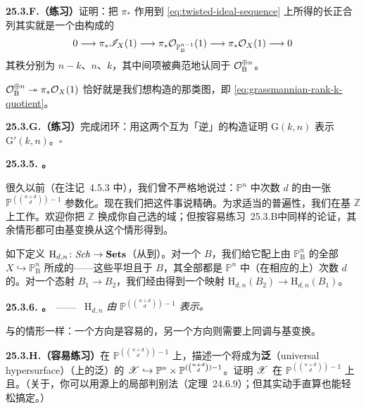 \textbf{25.3.F.（练习）}\quad 证明：把 $\pi_*$ 作用到 \eqref{eq:twisted-ideal-sequence} 上所得的长正合列其实就是一个由\trLocallyFreeSheaf{}构成的\trShortExactSequence
\[
0\longrightarrow\pi_*\mathscr{I}_X(1)\longrightarrow\pi_*\mathcal{O}_{\mathbb{P}^{n-1}_{\mathrm{B}}}(1)\longrightarrow\pi_*\mathcal{O}_X(1)\longrightarrow 0
\]
其秩分别为 $n-k$、$n$、$k$，其中间项被典范地认同于 $\mathcal{O}_{\mathrm{B}}^{\oplus n}$。

\trSurjectiveMap{} $\mathcal{O}_{\mathrm{B}}^{\oplus n}\twoheadrightarrow\pi_*\mathcal{O}_X(1)$ 恰好就是我们想构造的那类图，即 \eqref{eq:grassmannian-rank-k-quotient}。

\textbf{25.3.G.（练习）}\quad 完成闭环：用这两个互为「逆」的构造证明 $\mathrm{G}(k,n)$ 表示\trFunctor{} $\mathrm{G}'(k,n)$。\hfill$\square$

\textbf{25.3.5. \trHypersurface。}

很久以前（在\mbox{注记~4.5.3} 中），我们曾不严格地说过：$\mathbb{P}^n$ 中次数 $d$ 的\trHypersurface{}由一张 $\mathbb{P}^{(\binom{n+d}{d})-1}$ 参数化。现在我们把这件事说精确。为求适当的普遍性，我们在基 $\mathbb{Z}$ 上工作。欢迎你把 $\mathbb{Z}$ 换成你自己选的域；但按\mbox{容易练习~25.3.B}中同样的论证，其余情形都可由基变换从这个情形得到。

如下定义\trContravariantFunctor{} $\mathrm{H}_{d,n}\colon\mathit{Sch}\to\mathbf{Sets}$（从\trScheme{}到\trSet{}）。对一个\trScheme{} $B$，我们给它配上由 $\mathbb{P}^n_{\mathrm{B}}$ 的全部\trClosedSubscheme{} $X\hookrightarrow\mathbb{P}^n_{\mathrm{B}}$ 所成的\trSet{}——这些\trClosedSubscheme{}平坦且\trFinitelyPresented{}于 $B$，其全部\trFiber{}都是 $\mathbb{P}^n$ 中（在相应的\trResidueField{}上）次数 $d$ 的\trHypersurface。对一个态射 $B_1\to B_2$，我们经由\trPullback{}得到一个映射 $\mathrm{H}_{d,n}(B_2)\to\mathrm{H}_{d,n}(B_1)$。

\textbf{25.3.6. \trhProposition。}\ ——\ \emph{\trFunctor{} $\mathrm{H}_{d,n}$ 由 $\mathbb{P}^{(\binom{n+d}{d})-1}$ 表示。}

与\trGrassmannian{}的情形一样：一个方向是容易的，另一个方向则需要上同调与基变换。

\textbf{25.3.H.（容易练习）}\quad 在 $\mathbb{P}^{(\binom{n+d}{d})-1}$ 上，描述一个将成为\textbf{泛\trHypersurface}（universal hypersurface）（\trModuliSpace{}上的泛\trFamily）的\trClosedSubscheme{} $\mathscr{X}\hookrightarrow\mathbb{P}^n\times\mathbb{P}^{(\binom{n+d}{d})-1}$。证明 $\mathscr{X}$ 在 $\mathbb{P}^{(\binom{n+d}{d})-1}$ 上\trFlat{}且\trFinitelyPresented。（关于\trFlatness{}，你可以用源上\trFlatness{}的局部判别法（\mbox{定理~24.6.9}）；但其实动手直算也能轻松搞定。）

